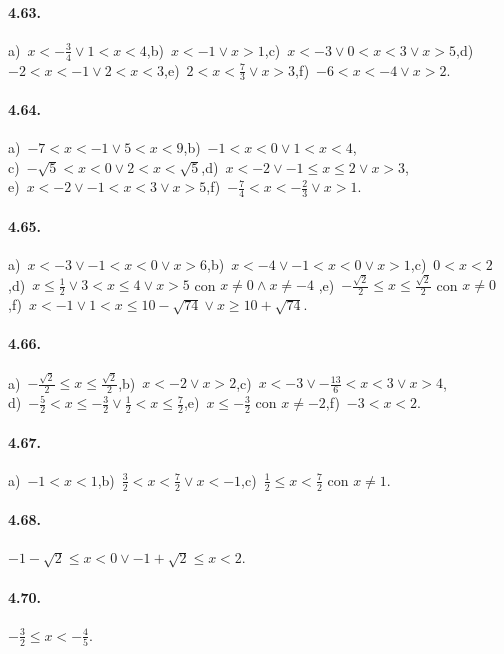 \paragraph{4.63.} a)~$x<-\frac 3 4\vee 1<x<4$,\quad b)~$x<-1\vee x>1$,\quad c)~$x<-3\vee 0<x<3\vee x>5$,\quad d)~$-2<x<-1\vee 2<x<3$,\quad e)~$2<x<\frac 7 3\vee x>3$,\quad f)~$-6<x<-4\vee x>2$.

\paragraph{4.64.} a)~$-7<x<-1\vee 5<x<9$,\quad b)~$-1<x<0\vee 1<x<4$,\protect\\
c)~$-\sqrt 5<x<0\vee 2<x<\sqrt 5$,\quad d)~$x<-2\vee -1\le x\le 2\vee x>3$,\protect\\
e)~$x<-2\vee -1<x<3\vee x>5$,\quad f)~$-\frac 7 4<x<-\frac 2 3\vee x>1$.

\paragraph{4.65.} a)~$x<-3\vee -1<x<0\vee x>6$,\quad b)~$x<-4\vee -1<x<0\vee x>1$,\quad c)~$0<x<2$,\quad d)~$x\le \frac 1 2\vee 3<x\le 4\vee x>5$ con $x\neq 0\wedge x\neq -4$ ,\quad e)~$-\frac{\sqrt 2} 2\le x\le \frac{\sqrt 2} 2$ con $x\neq 0$,\quad f)~$x<-1\vee 1<x\le 10-\sqrt{74}\vee x\ge 10+\sqrt{74}$.

\paragraph{4.66.} a)~$-\frac{\sqrt 2} 2\le x\le \frac{\sqrt 2} 2$,\quad b)~$x<-2\vee x>2$,\quad c)~$x<-3\vee -\frac{13} 6<x<3\vee x>4$,\protect\\
d)~$-\frac 5 2<x\le -\frac 3 2\vee \frac 1 2<x\le \frac 7 2$,\quad e)~$x\le -\frac 3 2$ con $x\neq -2$,\quad f)~$-3<x<2$.

\paragraph{4.67.} a)~$-1<x<1$,\quad b)~$\frac 3 2<x<\frac 7 2\vee x<-1$,\quad c)~$\frac 1 2\le x<\frac 7 2$ con $x\neq 1$.

\paragraph{4.68.} $-1-\sqrt 2\le x<0\vee -1+\sqrt 2\le x<2$.

\paragraph{4.70.} $-\frac 3 2\le x<-\frac 4 5$.

